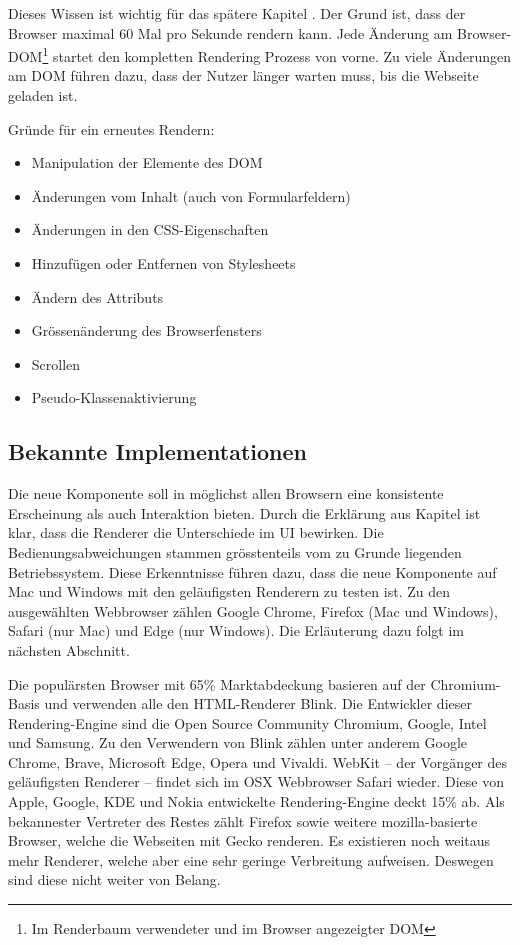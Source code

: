 Dieses Wissen ist wichtig für das spätere Kapitel \textbf{}. 
Der Grund ist, dass der Browser maximal 60 Mal pro Sekunde rendern kann. 
Jede Änderung am Browser-DOM\footnote{
    Im Renderbaum verwendeter und im Browser angezeigter DOM
} startet den kompletten Rendering Prozess von vorne. 
Zu viele Änderungen am DOM führen dazu, dass der Nutzer länger warten muss, bis die Webseite geladen ist. 

Gründe für ein erneutes Rendern: 

\begin{itemize}
    \item Manipulation der Elemente des DOM
    \item Änderungen vom Inhalt (auch von Formularfeldern)
    \item Änderungen in den CSS-Eigenschaften
    \item Hinzufügen oder Entfernen von Stylesheets
    \item Ändern des Attributs 
    \item Grössenänderung des Browserfensters
    \item Scrollen
    \item Pseudo-Klassenaktivierung
\end{itemize}


\subsection{Bekannte Implementationen}
\label{sec:implementationsRenderer}

Die neue Komponente soll in möglichst allen Browsern eine konsistente Erscheinung als auch Interaktion bieten. 
Durch die Erklärung aus Kapitel \textbf{} ist klar, dass die Renderer die Unterschiede im UI bewirken. 
Die Bedienungsabweichungen stammen grösstenteils vom zu Grunde liegenden Betriebssystem. 
Diese Erkenntnisse führen dazu, dass die neue Komponente auf Mac und Windows mit den geläufigsten Renderern zu testen ist. 
Zu den ausgewählten Webbrowser zählen Google Chrome, Firefox (Mac und Windows), Safari (nur Mac) und Edge (nur Windows). 
Die Erläuterung dazu folgt im nächsten Abschnitt. 

Die populärsten Browser mit 65\% Marktabdeckung basieren auf der Chromium-Basis und verwenden alle den HTML-Renderer Blink. 
Die Entwickler dieser Rendering-Engine sind die Open Source Community Chromium, Google, Intel und Samsung. 
Zu den Verwendern von Blink zählen unter anderem Google Chrome, Brave, Microsoft Edge, Opera und Vivaldi. 
WebKit – der Vorgänger des geläufigsten Renderer – findet sich im OSX Webbrowser Safari wieder. 
Diese von Apple, Google, KDE und Nokia entwickelte Rendering-Engine deckt 15\% ab. 
Als bekannester Vertreter des Restes zählt Firefox sowie weitere mozilla-basierte Browser, welche die Webseiten mit Gecko renderen. 
Es existieren noch weitaus mehr Renderer, welche aber eine sehr geringe Verbreitung aufweisen. 
Deswegen sind diese nicht weiter von Belang. 
